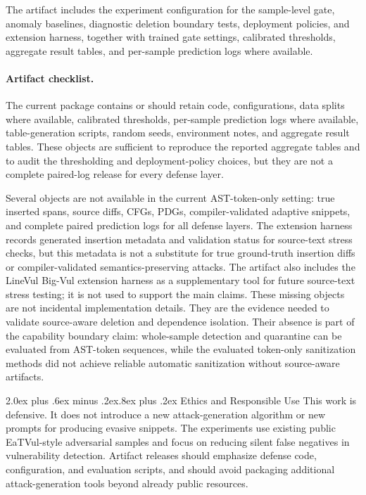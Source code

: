 \documentclass[letterpaper,twocolumn,10pt,twoside]{article}
\makeatletter
\renewcommand\section{\@startsection{section}{1}{\z@}%
  {2.0ex plus .6ex minus .2ex}{.8ex plus .2ex}%
  {\normalfont\large\bfseries}}
\newcounter{algorithm}
\newcommand{\gate}{sample-level gate}
\makeatother
\begin{document}
The artifact includes the experiment configuration for the \gate{}, anomaly baselines, diagnostic deletion boundary tests, deployment policies, and extension harness, together with trained gate settings, calibrated thresholds, aggregate result tables, and per-sample prediction logs where available.

\paragraph{Artifact checklist.} The current package contains or should retain code, configurations, data splits where available, calibrated thresholds, per-sample prediction logs where available, table-generation scripts, random seeds, environment notes, and aggregate result tables. These objects are sufficient to reproduce the reported aggregate tables and to audit the thresholding and deployment-policy choices, but they are not a complete paired-log release for every defense layer.

Several objects are not available in the current AST-token-only setting: true inserted spans, source diffs, CFGs, PDGs, compiler-validated adaptive snippets, and complete paired prediction logs for all defense layers. The extension harness records generated insertion metadata and validation status for source-text stress checks, but this metadata is not a substitute for true ground-truth insertion diffs or compiler-validated semantics-preserving attacks. The artifact also includes the LineVul Big-Vul extension harness as a supplementary tool for future source-text stress testing; it is not used to support the main claims. These missing objects are not incidental implementation details. They are the evidence needed to validate source-aware deletion and dependence isolation. Their absence is part of the capability boundary claim: whole-sample detection and quarantine can be evaluated from AST-token sequences, while the evaluated token-only sanitization methods did not achieve reliable automatic sanitization without source-aware artifacts.

\section{Ethics and Responsible Use}
This work is defensive. It does not introduce a new attack-generation algorithm or new prompts for producing evasive snippets. The experiments use existing public EaTVul-style adversarial samples and focus on reducing silent false negatives in vulnerability detection. Artifact releases should emphasize defense code, configuration, and evaluation scripts, and should avoid packaging additional attack-generation tools beyond already public resources.
\end{document}

